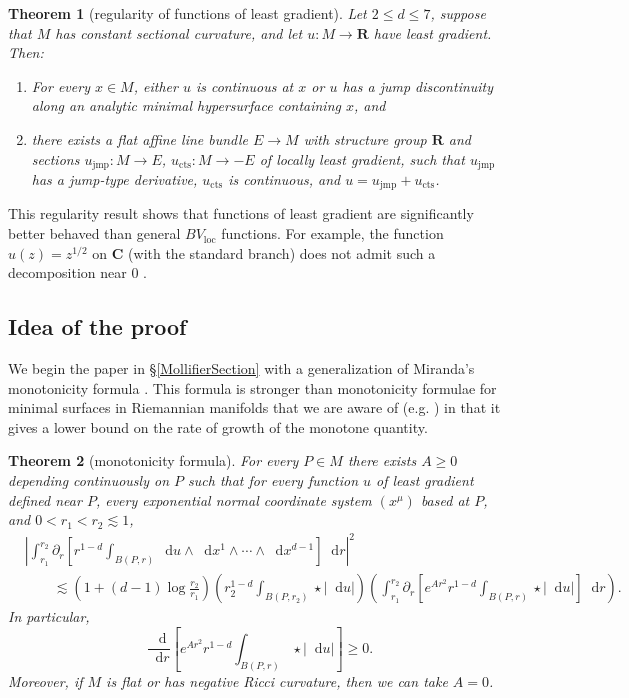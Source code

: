 \documentclass[reqno,10pt]{amsart}
\newcommand{\RR}{\mathbf{R}}
\newcommand{\CC}{\mathbf{C}}
\newcommand*\dif{\mathop{}\!\mathrm{d}}
\newcommand{\loc}{\mathrm{loc}}
\newtheorem{mainthm}{Theorem}
\theoremstyle{definition}
\numberwithin{equation}{section}
\begin{document}
\begin{mainthm}[regularity of functions of least gradient]\label{Gorny regularity}
Let $2 \leq d \leq 7$, suppose that $M$ has constant sectional curvature, and let $u: M \to \RR$ have least gradient.
Then:
\begin{enumerate}
\item For every $x \in M$, either $u$ is continuous at $x$ or $u$ has a jump discontinuity along an analytic minimal hypersurface containing $x$, and
\item there exists a flat affine line bundle $E \to M$ with structure group $\RR$ and sections $u_{\text{jmp}}: M \to E$, $u_{\text{cts}}: M \to -E$ of locally least gradient, such that $u_{\text{jmp}}$ has a jump-type derivative, $u_{\text{cts}}$ is continuous, and $u = u_{\text{jmp}} + u_{\text{cts}}$.
\end{enumerate}
\end{mainthm}

This regularity result shows that functions of least gradient are significantly better behaved than general $BV_\loc$ functions.
For example, the function $u(z) = z^{1/2}$ on $\CC$ (with the standard branch) does not admit such a decomposition near $0$ \cite[Example 4.1]{Ambrosio2000FunctionsOB}.

\subsection{Idea of the proof}
We begin the paper in \S\ref{MollifierSection} with a generalization of Miranda's monotonicity formula \cite[Theorem 2.8]{Miranda66}.
This formula is stronger than monotonicity formulae for minimal surfaces in Riemannian manifolds that we are aware of (e.g. \cite[\S7]{MarquesXX}) in that it gives a lower bound on the rate of growth of the monotone quantity.

\begin{mainthm}[monotonicity formula]\label{monotonicity prestate}
For every $P \in M$ there exists $A \geq 0$ depending continuously on $P$ such that for every function $u$ of least gradient defined near $P$, every exponential normal coordinate system $(x^\mu)$ based at $P$, and $0 < r_1 < r_2 \lesssim 1$,
\begin{align*}
&\left|\int_{r_1}^{r_2} \partial_r \left[r^{1 - d} \int_{B(P, r)} \dif u \wedge \dif x^1 \wedge \cdots \wedge \dif x^{d - 1}\right] \dif r\right|^2 \\
&\qquad \lesssim \left(1 + (d - 1) \log \frac{r_2}{r_1}\right) \left(r_2^{1 - d}\int_{B(P, r_2)} \star |\dif u| \right)\left(\int_{r_1}^{r_2} \partial_r \left[e^{Ar^2} r^{1 - d} \int_{B(P, r)} \star |\dif u|\right] \dif r\right).
\end{align*}
In particular,
\begin{equation}\label{weak monotonicity}
\frac{\dif}{\dif r} \left[e^{Ar^2} r^{1 - d} \int_{B(P, r)} \star |\dif u|\right] \geq 0.
\end{equation}
Moreover, if $M$ is flat or has negative Ricci curvature, then we can take $A = 0$.
\end{mainthm}
\end{document}
